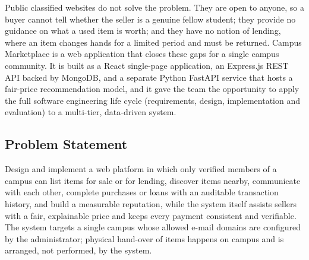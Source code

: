 \documentclass[12pt,letterpaper,twoside,openany]{report}
\begin{document}
Public classified websites do not solve the problem. They are open to anyone, so a buyer cannot
tell whether the seller is a genuine fellow student; they provide no guidance on what a used item
is worth; and they have no notion of lending, where an item changes hands for a limited period
and must be returned. Campus Marketplace is a web application that closes these gaps for a single
campus community. It is built as a React single-page application, an Express.js REST API backed by
MongoDB, and a separate Python FastAPI service that hosts a fair-price recommendation model, and
it gave the team the opportunity to apply the full software engineering life cycle (requirements,
design, implementation and evaluation) to a multi-tier, data-driven system.

\subsection{Problem Statement}
Design and implement a web platform in which only verified members of a campus can list items
for sale or for lending, discover items nearby, communicate with each other, complete purchases or
loans with an auditable transaction history, and build a measurable reputation, while the system
itself assists sellers with a fair, explainable price and keeps every payment consistent and
verifiable. The system targets a single campus whose allowed e-mail domains are configured by the
administrator; physical hand-over of items happens on campus and is arranged, not performed, by the
system.
\end{document}
